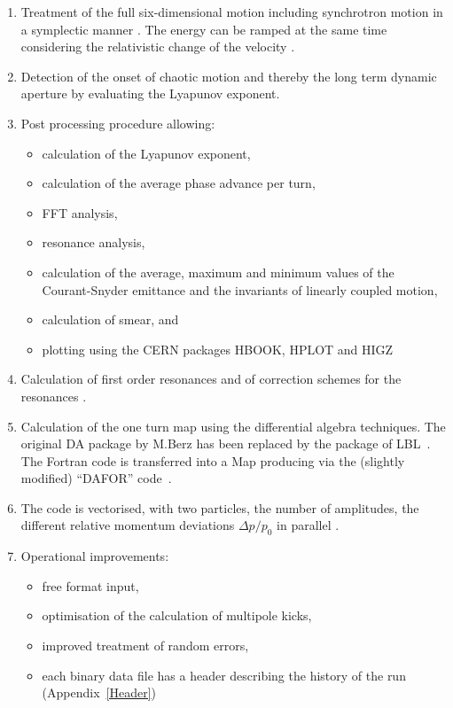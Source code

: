 \begin{enumerate}
    \item Treatment of the full six-dimensional motion including synchrotron motion in a symplectic manner \cite{Ripken85}. The energy can be ramped at the same time considering the relativistic change of the velocity \cite{Ripken87}.
    \item Detection of the onset of chaotic motion and thereby the long term dynamic aperture by evaluating the Lyapunov exponent.
    \item Post processing procedure allowing:
    \begin{itemize}
        \item calculation of the Lyapunov exponent,
        \item calculation of the average phase advance per turn,
        \item FFT analysis,
        \item resonance analysis,
        \item calculation of the average, maximum and minimum values of the Courant-Snyder emittance and the invariants of linearly coupled motion,
        \item calculation of smear, and
        \item plotting using the CERN packages HBOOK, HPLOT and HIGZ \cite{HBOOK,HPLOT,HIGZ}
    \end{itemize}
    \item Calculation of first order resonances and of correction schemes for the resonances \cite{Gilbert78}.
    \item Calculation of the one turn map using the differential algebra techniques. The original DA package by M.Berz \cite{Berz89} has been replaced by the package of LBL~\cite{DALIE}. The Fortran code is transferred into a Map producing via the (slightly modified) ``DAFOR'' code~\cite{DAFOR}.
    \item The code is vectorised, with two particles, the number of amplitudes, the different relative momentum deviations $\Delta p/p_0$ in parallel \cite{Sixvec}.
    \item Operational improvements:
    \begin{itemize}
        \item free format input,
        \item optimisation of the calculation of multipole kicks,
        \item improved treatment of random errors,
        \item each binary data file has a header describing the history of the run (Appendix~\ref{Header})
    \end{itemize}
\end{enumerate}

